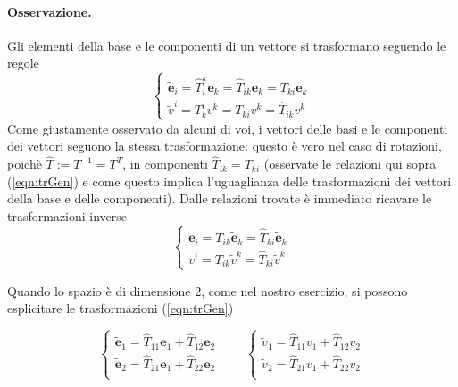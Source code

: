  
 
 
 
 
 
 
 
 
 



 \paragraph{Osservazione.}
 Gli elementi della base e le componenti di un vettore si trasformano seguendo le regole
 \begin{equation}
 \begin{cases}
  \tilde{\bm{e}}_i = \hat{T}^k_i \bm{e}_k  = \hat{T}_{ik} \bm{e}_k = T_{ki} \bm{e}_k\\
  \tilde{v}^i      = T^i_k v^k             = T_{ki} v^k            = \hat{T}_{ik} v^k
 \end{cases}
 \label{eqn:trGen}
 \end{equation}
 Come giustamente osservato da alcuni di voi, i vettori delle basi e le componenti dei vettori
 seguono la stessa trasformazione: questo è vero nel caso di rotazioni, poichè $\hat{T}:=T^{-1}=T^T$,
 in componenti $\hat{T}_{ik} = T_{ki}$ (osservate le relazioni qui sopra (\ref{eqn:trGen}) e come questo implica
 l'uguaglianza delle trasformazioni dei vettori della base e delle componenti). 
 Dalle relazioni trovate è immediato ricavare le trasformazioni inverse
 \begin{equation}
 \begin{cases}
  \bm{e}_i = T_{ik} \tilde{\bm{e}}_k = \hat{T}_{ki} \tilde{\bm{e}}_k\\
  v^i      = T_{ik} \tilde{v}^k      = \hat{T}_{ki} \tilde{v}^k
 \end{cases}
 \end{equation}
 
 \noindent
 Quando lo spazio è di dimensione 2, come nel nostro esercizio, si possono esplicitare le trasformazioni
 (\ref{eqn:trGen})
 
 \begin{equation}
 \begin{cases}
  \tilde{\bm{e}}_1 =  \hat{T}_{11} \bm{e}_1 + \hat{T}_{12} \bm{e}_2 \\
  \tilde{\bm{e}}_2 =  \hat{T}_{21} \bm{e}_1 + \hat{T}_{22} \bm{e}_2 \\
 \end{cases}
 \qquad
 \begin{cases}
  \tilde{v}_1 =  \hat{T}_{11} v_1 + \hat{T}_{12} v_2 \\
  \tilde{v}_2 =  \hat{T}_{21} v_1 + \hat{T}_{22} v_2 \\
 \end{cases}
 \label{eqn:trGen2}
 \end{equation}
 
